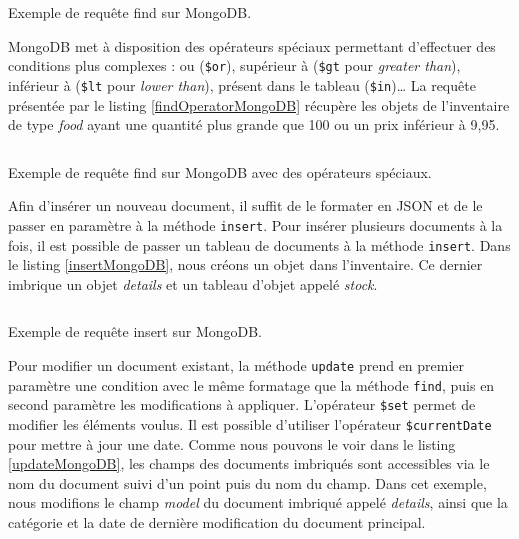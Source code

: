   \begin{listing}[H]
    \inputminted{javascript}{code/requeteMongoFind.js}
    \caption{Exemple de requête find sur MongoDB.}
    \label{findMongoDB}
  \end{listing}

  MongoDB met à disposition des opérateurs spéciaux permettant d'effectuer des conditions plus complexes : ou (\verb|$or|), supérieur à (\verb|$gt| pour \textit{greater than}), inférieur à (\verb|$lt| pour \textit{lower than}), présent dans le tableau (\verb|$in|)\dots{} La requête présentée par le listing \ref{findOperatorMongoDB} récupère les objets de l'inventaire de type \textit{food} ayant une quantité plus grande que 100 ou un prix inférieur à 9,95.

  \begin{listing}[H]
    \inputminted{javascript}{code/requeteMongoFindOperator.js}
    \caption{Exemple de requête find sur MongoDB avec des opérateurs spéciaux.}
    \label{findOperatorMongoDB}
  \end{listing}

  Afin d'insérer un nouveau document, il suffit de le formater en JSON et de le passer en paramètre à la méthode \verb|insert|. Pour insérer plusieurs documents à la fois, il est possible de passer un tableau de documents à la méthode \verb|insert|. Dans le listing \ref{insertMongoDB}, nous créons un objet dans l'inventaire. Ce dernier imbrique un objet \textit{details} et un tableau d'objet appelé \textit{stock}.

  \begin{listing}[H]
    \inputminted{javascript}{code/requeteMongoInsert.js}
    \caption{Exemple de requête insert sur MongoDB.}
    \label{insertMongoDB}
  \end{listing}

  Pour modifier un document existant, la méthode \verb|update| prend en premier paramètre une condition avec le même formatage que la méthode \verb|find|, puis en second paramètre les modifications à appliquer. L'opérateur \verb|$set| permet de modifier les éléments voulus. Il est possible d'utiliser l'opérateur \verb|$currentDate| pour mettre à jour une date. Comme nous pouvons le voir dans le listing \ref{updateMongoDB}, les champs des documents imbriqués sont accessibles via le nom du document suivi d'un point puis du nom du champ. Dans cet exemple, nous modifions le champ \textit{model} du document imbriqué appelé \textit{details}, ainsi que la catégorie et la date de dernière modification du document principal.

